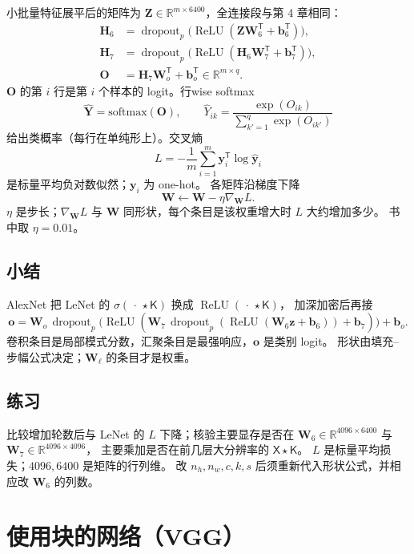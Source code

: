 小批量特征展平后的矩阵为 $\bm{Z}\in\mathbb{R}^{m\times 6400}$，全连接段与第 4 章相同：
\begin{align*}
\bm{H}_6
&=
\operatorname{dropout}_{p}\bigl(\operatorname{ReLU}(\bm{Z}\bm{W}_6^{\mathsf T}+\bm{b}_6^{\mathsf T})\bigr),\\
\bm{H}_7
&=
\operatorname{dropout}_{p}\bigl(\operatorname{ReLU}(\bm{H}_6\bm{W}_7^{\mathsf T}+\bm{b}_7^{\mathsf T})\bigr),\\
\bm{O}
&=
\bm{H}_7\bm{W}_o^{\mathsf T}+\bm{b}_o^{\mathsf T}
\in\mathbb{R}^{m\times q}.
\end{align*}
$\bm{O}$ 的第 $i$ 行是第 $i$ 个样本的 logit。行wise softmax
\[
\hat{\bm{Y}}
=
\mathrm{softmax}(\bm{O}),
\qquad
\hat{Y}_{ik}
=
\frac{\exp(O_{ik})}{\sum_{k'=1}^{q}\exp(O_{ik'})}
\]
给出类概率（每行在单纯形上）。交叉熵
\[
L
=
-\frac{1}{m}\sum_{i=1}^{m}
\bm{y}_i^{\mathsf T}\log\hat{\bm{y}}_i
\]
是标量平均负对数似然；$\bm{y}_i$ 为 one-hot。
各矩阵沿梯度下降
\[
\bm{W}
\leftarrow
\bm{W}-\eta\nabla_{\bm{W}}L.
\]
$\eta$ 是步长；$\nabla_{\bm{W}}L$ 与 $\bm{W}$ 同形状，每个条目是该权重增大时 $L$ 大约增加多少。
书中取 $\eta=0.01$。

\subsection{小结}

AlexNet 把 LeNet 的 $\sigma(\,\cdot\,\star\mathsf{K})$ 换成 $\operatorname{ReLU}(\,\cdot\,\star\mathsf{K})$，
加深加密后再接
\[
\bm{o}
=
\bm{W}_o\,
\operatorname{dropout}_{p}\bigl(\operatorname{ReLU}(
\bm{W}_7\,
\operatorname{dropout}_{p}(\operatorname{ReLU}(\bm{W}_6\bm{z}+\bm{b}_6))
+\bm{b}_7)\bigr)
+\bm{b}_o.
\]
卷积条目是局部模式分数，汇聚条目是最强响应，$\bm{o}$ 是类别 logit。
形状由填充--步幅公式决定；$\bm{W}_\ell$ 的条目才是权重。

\subsection{练习}

比较增加轮数后与 LeNet 的 $L$ 下降；核验主要显存是否在
$\bm{W}_6\in\mathbb{R}^{4096\times 6400}$ 与 $\bm{W}_7\in\mathbb{R}^{4096\times 4096}$，
主要乘加是否在前几层大分辨率的 $\mathsf{X}\star\mathsf{K}$。
$L$ 是标量平均损失；$4096,6400$ 是矩阵的行列维。
改 $n_h,n_w,c,k,s$ 后须重新代入形状公式，并相应改 $\bm{W}_6$ 的列数。

\section{使用块的网络（VGG）}

